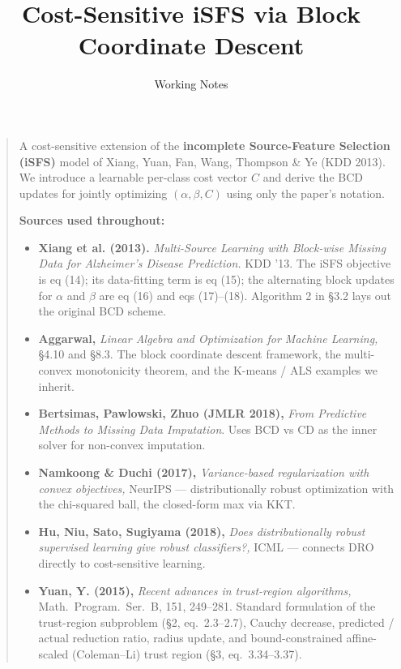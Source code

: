 \documentclass[11pt,a4paper]{article}
\title{Cost-Sensitive iSFS via Block Coordinate Descent}
\author{Working Notes}
\date{}
\begin{document}
\maketitle

\begin{quote}
A cost-sensitive extension of the \textbf{incomplete Source-Feature Selection (iSFS)} model of Xiang, Yuan, Fan, Wang, Thompson \& Ye (KDD 2013). We introduce a learnable per-class cost vector $C$ and derive the BCD updates for jointly optimizing $(\alpha, \beta, C)$ using only the paper's notation.

\medskip
\noindent\textbf{Sources used throughout:}
\begin{itemize}[leftmargin=*,itemsep=2pt]
  \item \textbf{Xiang et al. (2013).} \emph{Multi-Source Learning with Block-wise Missing Data for Alzheimer's Disease Prediction.} KDD '13. The iSFS objective is eq (14); its data-fitting term is eq (15); the alternating block updates for $\alpha$ and $\beta$ are eq (16) and eqs (17)--(18). Algorithm 2 in \S 3.2 lays out the original BCD scheme.
  \item \textbf{Aggarwal,} \emph{Linear Algebra and Optimization for Machine Learning,} \S 4.10 and \S 8.3. The block coordinate descent framework, the multi-convex monotonicity theorem, and the K-means / ALS examples we inherit.
  \item \textbf{Bertsimas, Pawlowski, Zhuo (JMLR 2018),} \emph{From Predictive Methods to Missing Data Imputation}. Uses BCD vs CD as the inner solver for non-convex imputation.
  \item \textbf{Namkoong \& Duchi (2017),} \emph{Variance-based regularization with convex objectives,} NeurIPS --- distributionally robust optimization with the chi-squared ball, the closed-form max via KKT.
  \item \textbf{Hu, Niu, Sato, Sugiyama (2018),} \emph{Does distributionally robust supervised learning give robust classifiers?,} ICML --- connects DRO directly to cost-sensitive learning.
  \item \textbf{Yuan, Y. (2015),} \emph{Recent advances in trust-region algorithms,} Math.\ Program.\ Ser.\ B, 151, 249--281. Standard formulation of the trust-region subproblem (\S 2, eq.\ 2.3--2.7), Cauchy decrease, predicted / actual reduction ratio, radius update, and bound-constrained affine-scaled (Coleman--Li) trust region (\S 3, eq.\ 3.34--3.37).
\end{itemize}
\end{quote}
\end{document}
